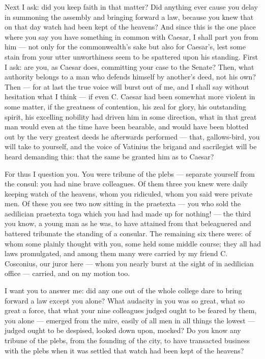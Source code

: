  Next I ask: did you keep faith in that matter? Did anything ever cause you delay in summoning the assembly and bringing forward a law, because you knew that on that day watch had been kept of the heavens? And since this is the one place where you say you have something in common with Caesar, I shall part you from him --- not only for the commonwealth's sake but also for Caesar's, lest some stain from your utter unworthiness seem to be spattered upon his standing. First I ask: are you, as Caesar does, committing your case to the Senate? Then, what authority belongs to a man who defends himself by another's deed, not his own? Then --- for at last the true voice will burst out of me, and I shall say without hesitation what I think --- if even C. Caesar had been somewhat more violent in some matter, if the greatness of contention, his zeal for glory, his outstanding spirit, his excelling nobility had driven him in some direction, what in that great man would even at the time have been bearable, and would have been blotted out by the very greatest deeds he afterwards performed --- that, gallows-bird, you will take to yourself, and the voice of Vatinius the brigand and sacrilegist will be heard demanding this: that the same be granted him as to Caesar?

 For thus I question you. You were tribune of the plebs --- separate yourself from the consul: you had nine brave colleagues. Of them three you knew were daily keeping watch of the heavens, whom you ridiculed, whom you said were private men. Of these you see two now sitting in the praetexta --- you who sold the aedilician praetexta toga which you had had made up for nothing! --- the third you know, a young man as he was, to have attained from that beleaguered and battered tribunate the standing of a consular. The remaining six there were: of whom some plainly thought with you, some held some middle course; they all had laws promulgated, and among them many were carried by my friend C. Cosconius, our juror here --- whom you nearly burst at the sight of in aedilician office --- carried, and on my motion too.

 I want you to answer me: did any one out of the whole college dare to bring forward a law except you alone? What audacity in you was so great, what so great a force, that what your nine colleagues judged ought to be feared by them, you alone --- emerged from the mire, easily of all men in all things the lowest --- judged ought to be despised, looked down upon, mocked? Do you know any tribune of the plebs, from the founding of the city, to have transacted business with the plebs when it was settled that watch had been kept of the heavens?

